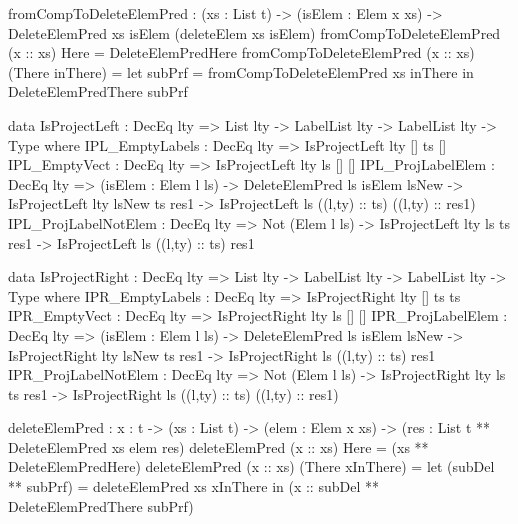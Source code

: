\begin{code}
fromCompToDeleteElemPred : (xs : List t) -> 
  (isElem : Elem x xs) -> 
  DeleteElemPred xs isElem (deleteElem xs isElem)
fromCompToDeleteElemPred (x :: xs) Here = DeleteElemPredHere
fromCompToDeleteElemPred (x :: xs) (There inThere) =
  let subPrf = fromCompToDeleteElemPred xs inThere
  in DeleteElemPredThere subPrf
        
data IsProjectLeft : DecEq lty => List lty -> LabelList lty -> 
  LabelList lty -> Type where
  IPL_EmptyLabels : DecEq lty => IsProjectLeft {lty} [] ts []
  IPL_EmptyVect : DecEq lty => IsProjectLeft {lty} ls [] []
  IPL_ProjLabelElem : DecEq lty => (isElem : Elem l ls) -> 
    DeleteElemPred ls isElem lsNew -> 
    IsProjectLeft {lty} lsNew ts res1 -> 
    IsProjectLeft ls ((l,ty) :: ts) ((l,ty) :: res1)      
  IPL_ProjLabelNotElem : DecEq lty => Not (Elem l ls) -> 
    IsProjectLeft {lty} ls ts res1 -> 
    IsProjectLeft ls ((l,ty) :: ts) res1
  
data IsProjectRight : DecEq lty => List lty -> LabelList lty -> 
  LabelList lty -> Type where
  IPR_EmptyLabels : DecEq lty => IsProjectRight {lty} [] ts ts
  IPR_EmptyVect : DecEq lty => IsProjectRight {lty} ls [] []
  IPR_ProjLabelElem : DecEq lty => (isElem : Elem l ls) -> 
    DeleteElemPred ls isElem lsNew -> 
    IsProjectRight {lty} lsNew ts res1 -> 
    IsProjectRight ls ((l,ty) :: ts) res1      
  IPR_ProjLabelNotElem : DecEq lty => Not (Elem l ls) ->  
    IsProjectRight {lty} ls ts res1 -> 
    IsProjectRight ls ((l,ty) :: ts) ((l,ty) :: res1)
  
deleteElemPred : {x : t} -> (xs : List t) -> (elem : Elem x xs) -> 
  (res : List t ** DeleteElemPred xs elem res)
deleteElemPred (x :: xs) Here = (xs ** DeleteElemPredHere)
deleteElemPred (x :: xs) (There xInThere) =
  let (subDel ** subPrf) = deleteElemPred xs xInThere
  in (x :: subDel ** DeleteElemPredThere subPrf)
          

\end{code}
